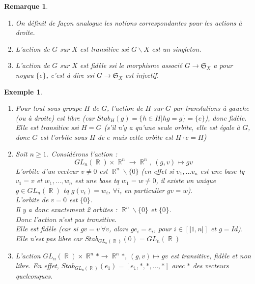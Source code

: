 \documentclass[a4paper, oneside]{report}
\theoremstyle{break}
\newtheorem{exem}[thm]{Exemple}
\newtheorem{remar}[thm]{Remarque}
\newcommand{\x}{\times}
\DeclareMathOperator{\R}{\mathbb{R}}
\renewcommand{\S}{\mathfrak{S}}
\begin{document}
\begin{remar}
	\begin{enumerate}
		\item On définit de façon analogue les notions correspondantes pour les actions à droite.
		\item L'action de $G$ sur $X$ est transitive ssi $G\backslash X$ est un singleton.
		\item L'action de $G$ sur $X$ est fidèle ssi le morphisme associé $G\rightarrow \S_X$ a pour noyau $\{e\}$, c'est à dire ssi $G\rightarrow \S_X$ est injectif.
	\end{enumerate}	
\end{remar}

\begin{exem}
	\begin{enumerate}
		\item Pour tout sous-groupe $H$ de $G$, l'action de $H$ sur $G$ par translations à gauche (ou à droite) est libre (car $Stab_H(g)=\{h\in H |hg=g \}=\{e\}$), donc fidèle.\\
		Elle est transitive ssi $H=G$ (s'il n'y a qu'une seule orbite, elle est égale à $G$, donc $G$ est l'orbite sous $H$ de $e$ mais cette orbite est $H \cdot e=H$)
		\item Soit $n\geq 1$. Considérons l'action :
		$$GL_n(\R)\x \R^n \rightarrow \R^n,~(g,v)\mapsto gv $$
		L'orbite d'un vecteur $v\neq 0$ est $\R^n\backslash \{0\}$ (en effet si $v_1,...v_n$ est une base tq $v_1 = v$ et $w_1,...,w_n$ est une base tq $w_1=w\neq 0$, il existe un unique $g\in GL_n(\R)$ tq $g(v_i)=w_i$, $\forall i$, en particulier $gv=w$).\\
		L'orbite de $v=0$ est $\{0\}$.\\
		Il y a donc exactement 2 orbites : $\R^n\backslash \{0\}$ et $\{0\}$.\\
		Donc l'action n'est pas transitive.\\
		Elle est fidèle (car si $gv=v~\forall v$, alors $ge_i=e_i$, pour $i\in [|1,n|]$ et $g=Id$).\\
		Elle n'est pas libre car $Stab_{GL_n(\R)}(0)=GL_n(\R)$
		
		\item L'action $GL_n(\R)\x \R^n* \rightarrow \R^n*,~(g,v)\mapsto gv $ est transitive, fidèle et non libre. En effet, $Stab_{GL_n(\R)}(e_1)=[e_1,*,*,...,*]$ avec $*$ des vecteurs quelconques.
		

\end{enumerate}
\end{exem}
\end{document}
